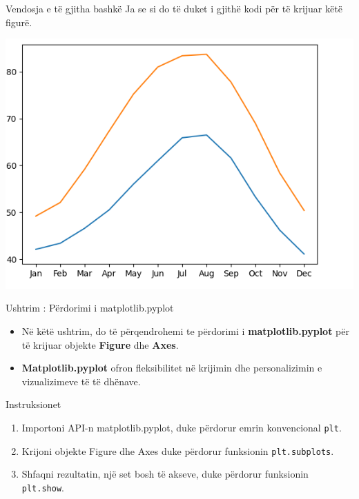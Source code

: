 \documentclass[
  ignorenonframetext,
]{beamer}
\begin{document}
\begin{frame}{Vendosja e të gjitha bashkë}
\protect\hypertarget{vendosja-e-tuxeb-gjitha-bashkuxeb}{}
Ja se si do të duket i gjithë kodi për të krijuar këtë figurë.

\includegraphics{./Figs/matplot3.png}
\end{frame}

\begin{frame}{Ushtrim : Përdorimi i matplotlib.pyplot}
\protect\hypertarget{ushtrim-puxebrdorimi-i-matplotlib.pyplot}{}
\begin{itemize}
\item
  Në këtë ushtrim, do të përqendrohemi te përdorimi i
  \textbf{matplotlib.pyplot} për të krijuar objekte \textbf{Figure} dhe
  \textbf{Axes}.
\item
  \textbf{Matplotlib.pyplot} ofron fleksibilitet në krijimin dhe
  personalizimin e vizualizimeve të të dhënave.
\end{itemize}
\end{frame}

\begin{frame}[fragile]{Instruksionet}
\protect\hypertarget{instruksionet}{}
\begin{enumerate}
\item
  Importoni API-n matplotlib.pyplot, duke përdorur emrin konvencional
  \texttt{plt}.
\item
  Krijoni objekte Figure dhe Axes duke përdorur funksionin
  \texttt{plt.subplots}.
\item
  Shfaqni rezultatin, një set bosh të akseve, duke përdorur funksionin
  \texttt{plt.show}.
\end{enumerate}
\end{frame}
\end{document}
